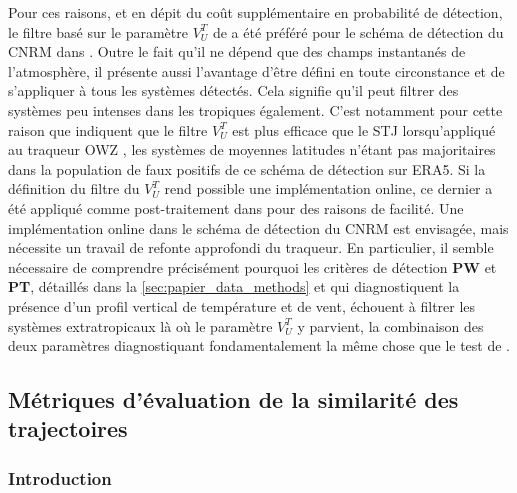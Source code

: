\documentclass[../main.tex]{subfiles}
\begin{document}
Pour ces raisons, et en dépit du coût supplémentaire en probabilité de détection, le filtre basé sur le paramètre $V_U^T$ de \textcite{hart_cyclone_2003} a été
préféré pour le schéma de détection du CNRM dans \textcite{dulac_assessing_2023}. Outre le fait qu'il ne dépend que des champs instantanés de l'atmosphère, il
présente aussi l'avantage d'être défini en toute circonstance et de s'appliquer à tous les systèmes détectés. Cela signifie qu'il peut filtrer des systèmes peu
intenses dans les tropiques également. C'est notamment pour cette raison que \textcite{bourdin_intercomparison_2022} indiquent que le filtre $V_U^T$ est plus
efficace que le STJ lorsqu'appliqué au traqueur OWZ \parencite{tory_importance_2013}, les systèmes de moyennes latitudes n'étant pas majoritaires dans la
population de faux positifs de ce schéma de détection sur ERA5. Si la définition du filtre du $V_U^T$ rend possible une implémentation online, ce dernier a été
appliqué comme post-traitement dans \textcite{dulac_assessing_2023} pour des raisons de facilité. Une implémentation online dans le schéma de détection du CNRM est
envisagée, mais nécessite un travail de refonte approfondi du traqueur. En particulier, il semble nécessaire de comprendre précisément pourquoi les critères de
détection \textbf{PW} et \textbf{PT}, détaillés dans la \cref{sec:papier_data_methods} et qui diagnostiquent la présence d'un profil vertical de température et
de vent, échouent à filtrer les systèmes extratropicaux là où le paramètre $V_U^T$ y parvient, la combinaison des deux paramètres diagnostiquant
fondamentalement la même chose que le test de \citeauthor{hart_cyclone_2003}.

\subsection{Métriques d'évaluation de la similarité des trajectoires}\label{sec:similarité}

\subsubsection*{Introduction}
\end{document}
